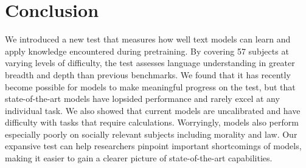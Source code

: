 \section{Conclusion}



We introduced a new test that measures how well text models can learn and apply knowledge encountered during pretraining. By covering 57 subjects at varying levels of difficulty, the test assesses language understanding in greater breadth and depth than previous benchmarks.
We found that it has recently become possible for models to make meaningful progress on the test, but that state-of-the-art models have lopsided performance and rarely excel at any individual task. We also showed that current models are uncalibrated and have difficulty with tasks that require calculations. Worryingly, models also perform especially poorly on socially relevant subjects including morality and law.
Our expansive test can help researchers pinpoint important shortcomings of models, making it easier to gain a clearer picture of state-of-the-art capabilities.

